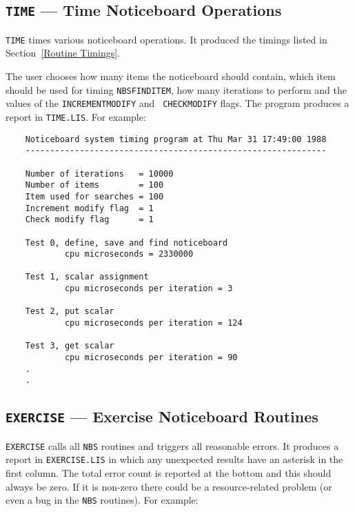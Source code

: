 \documentclass[twoside,11pt]{article}
\renewcommand{\_}{\texttt{\symbol{95}}}
\begin{document}
\subsection {{\tt TIME} --- Time Noticeboard Operations}

{\tt TIME} times various noticeboard operations. It produced the timings listed
in Section~\ref {Routine Timings}.

The user chooses how many items the noticeboard should contain, which item
should be used for timing {\tt NBS\_FIND\_ITEM}, how many iterations to perform
and the values of the {\tt INC\-RE\-MENT\_\-MOD\-IFY} and {\tt
CHECK\_\-MOD\-IFY} flags. The program produces a report in {\tt TIME.LIS}. For
example:

\begin {verbatim}
    Noticeboard system timing program at Thu Mar 31 17:49:00 1988
    -------------------------------------------------------------

    Number of iterations   = 10000
    Number of items        = 100
    Item used for searches = 100
    Increment modify flag  = 1
    Check modify flag      = 1

    Test 0, define, save and find noticeboard
            cpu microseconds = 2330000

    Test 1, scalar assignment
            cpu microseconds per iteration = 3

    Test 2, put scalar
            cpu microseconds per iteration = 124

    Test 3, get scalar
            cpu microseconds per iteration = 90
    .
    .
\end{verbatim}

\subsection {{\tt EXERCISE} --- Exercise Noticeboard Routines}

{\tt EXERCISE} calls all {\tt NBS} routines and triggers all reasonable
errors. It produces a report in {\tt EXERCISE.LIS} in which any unexpected
results have an asterisk in the first column. The total error count is reported
at the bottom and this should always be zero. If it is non-zero there could
be a resource-related problem (or even a bug in the {\tt NBS} routines).
For example:
\end{document}
